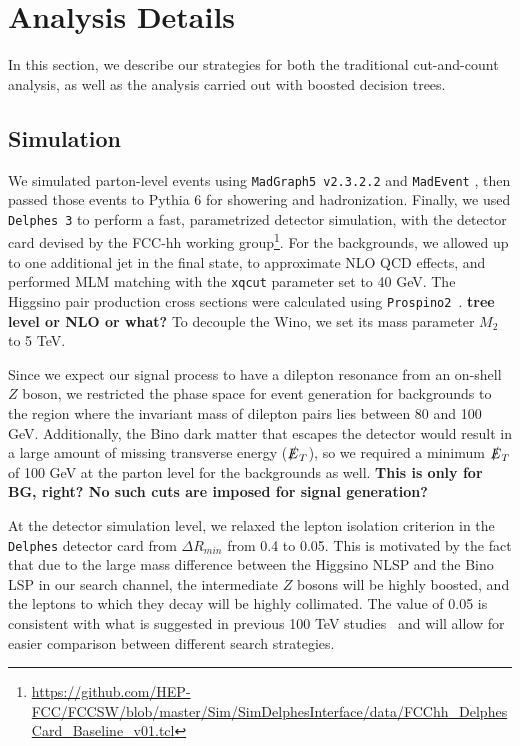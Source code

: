 \documentclass[a4paper,11pt]{article}
\newcommand{\Shufang}[1]{{\bf\color{Maroon}  #1}}
\newcommand{\met}{{\slashed{E}_T}}
\begin{document}
\section{Analysis Details}\label{sec:analysis}

In this section, we  describe our strategies for both the traditional
cut-and-count analysis, as well as the analysis carried out with boosted
decision trees. 

\subsection{Simulation}\label{simulation}

We simulated parton-level events using \texttt{MadGraph5 v2.3.2.2} and
\texttt{MadEvent} \citep{Alwall:2014hca}, then passed those events to Pythia 6
\citep{Sjostrand:2006za} for showering and hadronization. Finally, we used
\texttt{Delphes 3} \citep{deFavereau:2013fsa} to perform a fast, parametrized
detector simulation, with the detector card devised by the FCC-hh working
group\footnote{\url{https://github.com/HEP-FCC/FCCSW/blob/master/Sim/SimDelphesInterface/data/FCChh_DelphesCard_Baseline_v01.tcl}}.
For the backgrounds, we allowed up to one additional jet in the final state, to
approximate NLO QCD effects, and performed MLM matching with the \texttt{xqcut}
parameter set to 40 GeV. The Higgsino pair production cross sections were
calculated using \texttt{Prospino2}~\citep{Beenakker:1999xh}. \Shufang{tree level or NLO or what?}  To decouple the
Wino, we set its mass parameter $M_2$ to 5 TeV.  

Since we expect our signal process to have a dilepton resonance from an on-shell
$Z$ boson, we restricted the phase space for event generation for backgrounds to
the region where the invariant mass of dilepton pairs lies between 80 and 100
GeV. Additionally, the Bino dark matter that escapes the detector would result
in a large amount of missing transverse energy ($\met$), so we required
a minimum $\met$ of 100 GeV at the parton level for the backgrounds as
well.  \Shufang{This is only for BG, right?  No such cuts are imposed for signal generation?}

At the detector simulation level, we relaxed the lepton isolation criterion in the
\texttt{Delphes} detector card from $\Delta R_{min}$ from 0.4 to 0.05. This is
motivated by the fact that due to the large mass difference between the Higgsino
NLSP and the Bino LSP in our search channel, the intermediate $Z$ bosons will be
highly boosted, and the leptons to which they decay will be highly collimated.
The value of 0.05 is consistent with what is suggested in previous 100 TeV
studies~\citep{Acharya:2014pua,Gori:2014oua,Bramante:2014tba} and will allow
for easier comparison between different search strategies.
\end{document}
